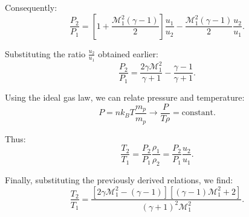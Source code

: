 Consequently:
%
\[
\frac{P_2}{P_1} = \left[1 + \frac{\mathcal{M}_1^2(\gamma-1)}{2} \right] \frac{u_1}{u_2} - \frac{\mathcal{M}_1^2(\gamma-1)}{2} \frac{u_2}{u_1}.
\]

Substituting the ratio \( \frac{u_2}{u_1} \) obtained earlier:
%
\[
\frac{P_2}{P_1} = \frac{2\gamma \mathcal{M}_1^2}{\gamma + 1} - \frac{\gamma - 1}{\gamma + 1}.
\]

Using the ideal gas law, we can relate pressure and temperature:
%
\[
P = n k_B T \frac{m_p}{m_p} \rightarrow \frac{P}{T \rho} = \text{constant}.
\]

Thus:
%
\[
\frac{T_2}{T_1} = \frac{P_2}{P_1}\frac{\rho_1}{\rho_2} = \frac{P_2}{P_1}\frac{u_2}{u_1}.
\]

Finally, substituting the previously derived relations, we find:
%
\[
\frac{T_2}{T_1} = \frac{\left[ 2 \gamma \mathcal{M}_1^2 - (\gamma - 1) \right] \left[ (\gamma - 1) \mathcal{M}_1^2 + 2 \right]}{(\gamma + 1)^2 \mathcal{M}_1^2}.
\]